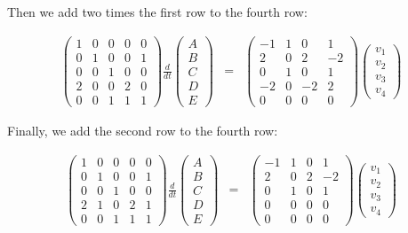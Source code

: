 \documentclass{article}
\begin{document}
Then we add two times the first row to the fourth row:

\begin{eqnarray*}
\begin{pmatrix} 1 & 0 & 0 & 0 & 0\\ 0 & 1 & 0 & 0 &1\\ 0 & 0 & 1 & 0 & 0\\ 2 & 0 & 0& 2 & 0\\ 0 & 0 & 1 & 1 & 1\end{pmatrix}
\frac{d}{dt} \begin{pmatrix} A\\ B \\ C\\ D\\ E \end{pmatrix} 
& = & \begin{pmatrix} -1 & 1 & 0 & 1\\
2 & 0 & 2 & -2\\
0 & 1 & 0 & 1\\
-2 & 0 & -2 & 2\\
0 & 0 & 0 & 0
\end{pmatrix} \begin{pmatrix} v_1\\ v_2 \\ v_3 \\ v_4 \end{pmatrix}
\end{eqnarray*}

Finally, we add the second row to the fourth row:

\begin{eqnarray*}
\begin{pmatrix} 1 & 0 & 0 & 0 & 0\\ 0 & 1 & 0 & 0 &1\\ 0 & 0 & 1 & 0 & 0\\ 2 & 1 & 0& 2 & 1\\ 0 & 0 & 1 & 1 & 1\end{pmatrix}
\frac{d}{dt} \begin{pmatrix} A\\ B \\ C\\ D\\ E \end{pmatrix} 
& = & \begin{pmatrix} -1 & 1 & 0 & 1\\
2 & 0 & 2 & -2\\
0 & 1 & 0 & 1\\
0 & 0 & 0 & 0\\
0 & 0 & 0 & 0
\end{pmatrix} \begin{pmatrix} v_1\\ v_2 \\ v_3 \\ v_4 \end{pmatrix}
\end{eqnarray*}
\end{document}
